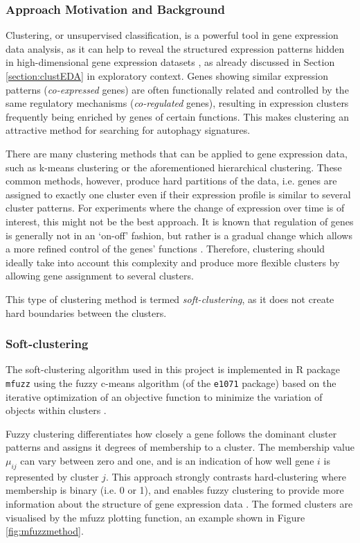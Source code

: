  
\subsubsection{Approach Motivation and Background}
Clustering, or unsupervised classification,  is a powerful tool in gene expression data analysis, as it can help to reveal the structured expression patterns hidden in high-dimensional gene expression datasets \cite{Kumar2007Mfuzz:Data}, as already discussed in Section \ref{section:clustEDA} in exploratory context. Genes showing similar expression patterns (\textit{co-expressed} genes) are often functionally related and controlled by the same regulatory mechanisms (\textit{co-regulated} genes), resulting in expression clusters frequently being enriched by genes of certain functions. This makes clustering an attractive method for searching for autophagy signatures. 
 
There are many clustering methods that can be applied to gene expression data, such as k-means clustering or the aforementioned hierarchical clustering. These common methods, however, produce hard partitions of the data, i.e. genes are assigned to exactly one cluster even if their expression profile is similar to several cluster patterns. For experiments where the change of expression over time is of interest, this might not be the best approach. It is known that regulation of genes is generally not in an `on-off' fashion, but rather is a gradual change which allows a more refined control of the genes' functions  \cite{Kumar2007Mfuzz:Data}. Therefore, clustering should ideally take into account this complexity and produce more flexible clusters by allowing gene assignment to several clusters.
 
This type of clustering method is termed \textit{soft-clustering}, as it does not  create hard boundaries between the clusters. 
 
\subsubsection{Soft-clustering}
 
The soft-clustering algorithm used in this project is implemented in R package \texttt{mfuzz} \cite{Kumar2007Mfuzz:Data}  using the fuzzy c-means algorithm (of the \texttt{e1071} package) based on the iterative optimization of an
objective function to minimize the variation of objects within clusters  \cite{Bezdek1981PatternAlgorithms}.
 
Fuzzy clustering differentiates how closely a gene follows the dominant cluster patterns and assigns it degrees of membership to a cluster. The membership value $\mu_{ij}$ can vary between zero and one, and is an indication of how well gene $i$ is represented by cluster $j$. This approach strongly contrasts hard-clustering where membership is binary (i.e. 0 or 1), and enables fuzzy clustering to provide more information about the structure of gene expression data \cite{Kumar2007Mfuzz:Data}. 
The formed clusters are visualised by the mfuzz plotting function, an example shown in Figure \ref{fig:mfuzzmethod}. 

